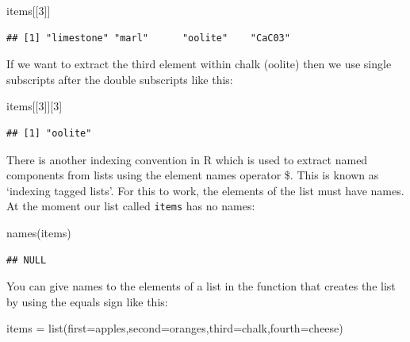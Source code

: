 \documentclass[
]{book}
\newenvironment{Shaded}{\begin{snugshade}}{\end{snugshade}}
\newcommand{\AttributeTok}[1]{\textcolor[rgb]{0.77,0.63,0.00}{#1}}
\newcommand{\DecValTok}[1]{\textcolor[rgb]{0.00,0.00,0.81}{#1}}
\newcommand{\FunctionTok}[1]{\textcolor[rgb]{0.00,0.00,0.00}{#1}}
\newcommand{\NormalTok}[1]{#1}
\newcommand{\OtherTok}[1]{\textcolor[rgb]{0.56,0.35,0.01}{#1}}
\begin{document}
\begin{Shaded}
\begin{Highlighting}[]
\NormalTok{items[[}\DecValTok{3}\NormalTok{]]}
\end{Highlighting}
\end{Shaded}

\begin{verbatim}
## [1] "limestone" "marl"      "oolite"    "CaC03"
\end{verbatim}

If we want to extract the third element within chalk (oolite) then we use single subscripts after the double subscripts like this:

\begin{Shaded}
\begin{Highlighting}[]
\NormalTok{items[[}\DecValTok{3}\NormalTok{]][}\DecValTok{3}\NormalTok{]}
\end{Highlighting}
\end{Shaded}

\begin{verbatim}
## [1] "oolite"
\end{verbatim}

There is another indexing convention in R which is used to extract named components from lists using the element names operator \$. This is known as `indexing tagged lists'. For this to work, the elements of the list must have names. At the moment our list called \texttt{items} has no names:

\begin{Shaded}
\begin{Highlighting}[]
\FunctionTok{names}\NormalTok{(items)}
\end{Highlighting}
\end{Shaded}

\begin{verbatim}
## NULL
\end{verbatim}

You can give names to the elements of a list in the function that creates the list by using the equals sign like this:

\begin{Shaded}
\begin{Highlighting}[]
\NormalTok{items }\OtherTok{=} \FunctionTok{list}\NormalTok{(}\AttributeTok{first=}\NormalTok{apples,}\AttributeTok{second=}\NormalTok{oranges,}\AttributeTok{third=}\NormalTok{chalk,}\AttributeTok{fourth=}\NormalTok{cheese)}
\end{Highlighting}
\end{Shaded}
\end{document}

